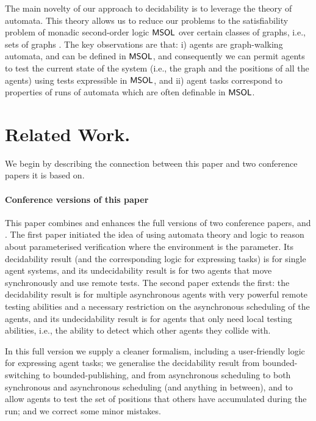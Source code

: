The main novelty of our approach to decidability is to leverage the theory of automata. This theory allows us to reduce our problems to the satisfiability problem of monadic second-order logic $\mathsf{MSOL}$ over certain classes of graphs, i.e., \courcellian sets of graphs \cite{Thomas90,Thomas96,ALG01,CE12}. The key observations are that: i) agents are graph-walking automata, and can be defined in $\mathsf{MSOL}$, and consequently we can permit agents to test the current state of the system (i.e., the graph and the positions of all the agents) using tests expressible in $\mathsf{MSOL}$, and ii) agent tasks correspond to properties of runs of automata which are often definable in $\mathsf{MSOL}$.

\section{Related Work.} \label{sec:related}





We begin by describing the connection between this paper and two conference papers it is based on.

\paragraph{Conference versions of this paper}
This paper combines and enhances the full versions of two conference papers, \cite{Rubin15AAMAS} and \cite{RZMA15}. The first paper initiated the idea of using automata 
theory and logic to reason about parameterised verification where the environment is the parameter. Its decidability result (and the corresponding logic for expressing tasks) is for single agent systems, and its undecidability result is for two agents that move  synchronously and use remote tests. The second paper extends the first: the decidability result is for multiple asynchronous agents with very powerful remote testing abilities and a necessary restriction on the asynchronous scheduling of the agents, and its undecidability result is for agents that only need local testing abilities, i.e., the ability to detect which other agents they collide with. 

In this full version we supply a cleaner formalism, including a user-friendly logic for expressing agent tasks; we generalise the decidability result from bounded-switching to bounded-publishing, and from asynchronous scheduling to both synchronous and asynchronous scheduling (and anything in between), and to allow agents to test the set of positions that others have accumulated during the run; 
and we correct some minor mistakes.

